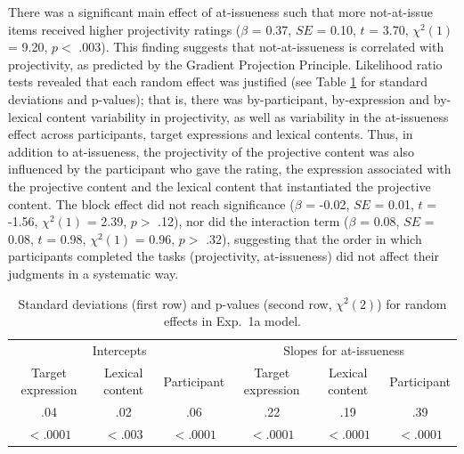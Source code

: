 \documentclass[11pt,fleqn]{article}
\newcommand{\6}{\mbox{$[\hspace*{-.6mm}[$}}
\newcommand{\9}{\mbox{$]\hspace*{-.6mm}]$}}
\newcommand{\tableref}[1]{Table \ref{#1}}
\begin{document}
There was a significant main effect of at-issueness such that more not-at-issue items received higher projectivity ratings ($\beta$ = 0.37, $SE$ = 0.10, $t$ = 3.70, $\chi^2(1)$ = 9.20, $p <$ .003). This finding suggests that not-at-issueness is correlated with projectivity, as predicted by the Gradient Projection Principle. Likelihood ratio tests revealed that each random effect was justified (see \tableref{tab:random1a} for standard deviations and p-values); that is, there was by-participant, by-expression and by-lexical content variability in projectivity, as well as variability in the at-issueness effect across participants, target expressions and lexical contents. Thus, in addition to at-issueness, the projectivity of the projective content was also influenced by the participant who gave the rating, the expression associated with the projective content and the lexical content that instantiated the projective content. The block effect did not reach significance ($\beta$ = -0.02, $SE$ = 0.01, $t$ = -1.56, $\chi^2(1)$ = 2.39, $p >$ .12), nor did the interaction term ($\beta$ = 0.08, $SE$ = 0.08, $t$ = 0.98, $\chi^2(1)$ = 0.96, $p >$ .32), suggesting that the order in which participants completed the tasks (projectivity, at-issueness) did not affect their judgments in a systematic way. 


\begin{table}
\begin{tabular}{c c c c c c }
\toprule
\multicolumn{3}{c}{Intercepts} & \multicolumn{3}{c}{Slopes for at-issueness}\\
Target expression & Lexical content & Participant & Target expression & Lexical content & Participant\\
\midrule
.04 & .02 & .06 & .22 & .19 & .39\\
$< .0001$ & $< .003$ & $< .0001$ & $< .0001$ & $< .0001$ & $< .0001$ \\
\bottomrule
\end{tabular}
\caption{Standard deviations (first row) and p-values (second row, $\chi^2(2)$) for random effects in Exp.~1a model.}\label{tab:random1a}
\end{table}
\end{document}
